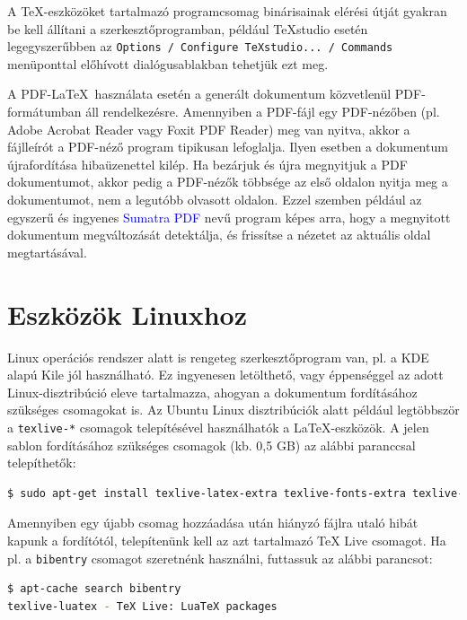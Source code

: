 A \TeX-eszközöket tartalmazó programcsomag binárisainak elérési útját gyakran be kell állítani a szerkesztőprogramban, például TeXstudio esetén legegyszerűbben az \verb+Options / Configure TeXstudio... / Commands+ menüponttal előhívott dialógusablakban tehetjük ezt meg.

A PDF-\LaTeX~használata esetén a generált dokumentum közvetlenül PDF-formátumban áll rendelkezésre. Amennyiben a PDF-fájl egy PDF-nézőben (pl. Adobe Acrobat Reader vagy Foxit PDF Reader) meg van nyitva, akkor a fájlleírót a PDF-néző program tipikusan lefoglalja. Ilyen esetben a dokumentum újrafordítása hibaüzenettel kilép. Ha bezárjuk és újra megnyitjuk a PDF dokumentumot, akkor pedig a PDF-nézők többsége az első oldalon nyitja meg a dokumentumot, nem a legutóbb olvasott oldalon. Ezzel szemben például az egyszerű és ingyenes \textcolor{blue}{Sumatra PDF} nevű program képes arra, hogy a megnyitott dokumentum megváltozását detektálja, és frissítse a nézetet az aktuális oldal megtartásával.

\section{Eszközök Linuxhoz}
Linux operációs rendszer alatt is rengeteg szerkesztőprogram van, pl. a KDE alapú Kile jól használható. Ez ingyenesen letölthető, vagy éppenséggel az adott Linux-disztribúció eleve tartalmazza, ahogyan a dokumentum fordításához szükséges csomagokat is. Az Ubuntu Linux disztribúciók alatt például legtöbbször a \verb+texlive-*+ csomagok telepítésével használhatók a \LaTeX-eszközök. A jelen sablon fordításához szükséges csomagok (kb. 0,5 GB) az alábbi paranccsal telepíthetők:

\begin{lstlisting}[language=bash,morekeywords={sudo,apt\-get},alsoletter={-},breaklines=true]
$ sudo apt-get install texlive-latex-extra texlive-fonts-extra texlive-fonts-recommended texlive-lang-european texlive-xetex texlive-science
\end{lstlisting}

Amennyiben egy újabb csomag hozzáadása után hiányzó fájlra utaló hibát kapunk a fordítótól, telepítenünk kell az azt tartalmazó TeX Live csomagot. Ha pl. a \verb+bibentry+ csomagot szeretnénk használni, futtassuk az alábbi parancsot:

\begin{lstlisting}[language=bash,morekeywords={apt\-cache},alsoletter={-},breaklines=true]
$ apt-cache search bibentry
texlive-luatex - TeX Live: LuaTeX packages
\end{lstlisting}

